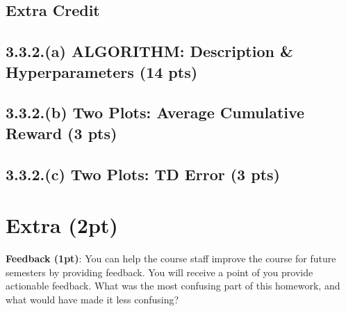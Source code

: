 \documentclass[12pt]{article}
\begin{document}


\subsection*{Extra Credit}
\subsection*{3.3.2.(a) ALGORITHM: Description \& Hyperparameters (14 pts)}

\begin{solution}[height=20cm]
\end{solution}

\subsection*{3.3.2.(b) Two Plots: Average Cumulative Reward (3 pts)}
\begin{solution}[height=7cm]
\end{solution}

\subsection*{3.3.2.(c) Two Plots: TD Error (3 pts)}
\begin{solution}[height=12cm]
\end{solution}

\clearpage
\section*{Extra (2pt)}

\textbf{Feedback (1pt)}: You can help the course staff improve the course for future semesters by providing feedback. You will receive a point of you provide actionable feedback. What was the most confusing part of this homework, and what would have made it less confusing?
\begin{solution}[height=4cm]
\end{solution}
\end{document}
